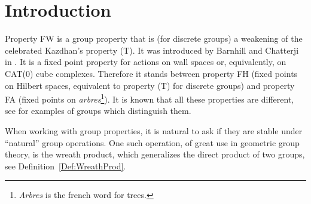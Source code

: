 %
%
%
%
%
%
%
%
%
%
\section{Introduction}
%
%
%
%
%
Property FW is a group property that is (for discrete groups) a weakening of the celebrated Kazdhan's property (T). It was introduced by Barnhill and Chatterji in \cite{Barnhill2008}. It is a fixed point property for actions on wall spaces or, equivalently, on CAT(0) cube complexes. Therefore it stands between property FH (fixed points on Hilbert spaces, equivalent to property (T) for discrete groups) and property FA (fixed points on \emph{arbres}\footnote{\emph{Arbres} is the french word for trees.}). It is known that all these properties are different, see  \cite{Cornulier2013} for examples of groups which distinguish them.

When working with group properties, it is natural to ask if they are stable under ``natural'' group operations. One such operation, of great use in geometric group theory, is the wreath product, which generalizes the direct product of two groups, see Definition~\ref{Def:WreathProd}.
%

